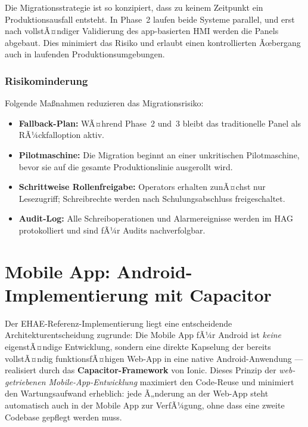 ﻿\documentclass[12pt,a4paper]{article}
\begin{document}
Die Migrationsstrategie ist so konzipiert, dass zu keinem Zeitpunkt ein Produktionsausfall
entsteht. In Phase~2 laufen beide Systeme parallel, und erst nach vollstÃ¤ndiger Validierung
des app-basierten HMI werden die Panels abgebaut. Dies minimiert das Risiko und erlaubt
einen kontrollierten Ãœbergang auch in laufenden Produktionsumgebungen.

\subsubsection{Risikominderung}

Folgende Ma\ss{}nahmen reduzieren das Migrationsrisiko:

\begin{itemize}[leftmargin=2em]
  \item \textbf{Fallback-Plan:} WÃ¤hrend Phase~2 und~3 bleibt das traditionelle Panel als
    RÃ¼ckfalloption aktiv.
  \item \textbf{Pilotmaschine:} Die Migration beginnt an einer unkritischen Pilotmaschine,
    bevor sie auf die gesamte Produktionslinie ausgerollt wird.
  \item \textbf{Schrittweise Rollenfreigabe:} Operators erhalten zunÃ¤chst nur
    Lesezugriff; Schreibrechte werden nach Schulungsabschluss freigeschaltet.
  \item \textbf{Audit-Log:} Alle Schreiboperationen und Alarmereignisse werden im HAG
    protokolliert und sind fÃ¼r Audits nachverfolgbar.
\end{itemize}

\section{Mobile App: Android-Implementierung mit Capacitor}
\label{sec:mobile}

Der EHAE-Referenz-Implementierung liegt eine entscheidende Architekturentscheidung
zugrunde: Die Mobile App fÃ¼r Android ist \emph{keine} eigenstÃ¤ndige Entwicklung,
sondern eine direkte Kapselung der bereits vollstÃ¤ndig funktionsfÃ¤higen Web-App in eine
native Android-Anwendung --- realisiert durch das \textbf{Capacitor-Framework}
\cite{capacitor} von Ionic. Dieses Prinzip der \emph{web-getriebenen
Mobile-App-Entwicklung} maximiert den Code-Reuse und minimiert den Wartungsaufwand
erheblich: jede Ã„nderung an der Web-App steht automatisch auch in der Mobile App zur
VerfÃ¼gung, ohne dass eine zweite Codebase gepflegt werden muss.
\end{document}
